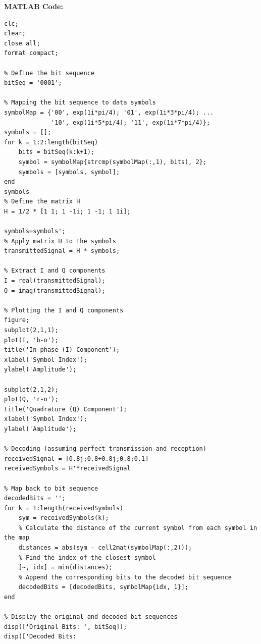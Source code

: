 \documentclass[12pt]{article}
\begin{document}
\newpage
\textbf{MATLAB Code:}
\begin{verbatim}
clc;
clear;
close all;
format compact;

% Define the bit sequence
bitSeq = '0001';

% Mapping the bit sequence to data symbols
symbolMap = {'00', exp(1i*pi/4); '01', exp(1i*3*pi/4); ...
             '10', exp(1i*5*pi/4); '11', exp(1i*7*pi/4)};
symbols = [];
for k = 1:2:length(bitSeq)
    bits = bitSeq(k:k+1);
    symbol = symbolMap{strcmp(symbolMap(:,1), bits), 2};
    symbols = [symbols, symbol];
end
symbols
% Define the matrix H
H = 1/2 * [1 1; 1 -1i; 1 -1; 1 1i];

symbols=symbols';
% Apply matrix H to the symbols
transmittedSignal = H * symbols;

% Extract I and Q components
I = real(transmittedSignal);
Q = imag(transmittedSignal);

% Plotting the I and Q components
figure;
subplot(2,1,1);
plot(I, 'b-o');
title('In-phase (I) Component');
xlabel('Symbol Index');
ylabel('Amplitude');

subplot(2,1,2);
plot(Q, 'r-o');
title('Quadrature (Q) Component');
xlabel('Symbol Index');
ylabel('Amplitude');

% Decoding (assuming perfect transmission and reception)
receivedSignal = [0.8j;0.8+0.8j;0.8;0.1]
receivedSymbols = H'*receivedSignal

% Map back to bit sequence
decodedBits = '';
for k = 1:length(receivedSymbols)
    sym = receivedSymbols(k);
    % Calculate the distance of the current symbol from each symbol in the map
    distances = abs(sym - cell2mat(symbolMap(:,2)));
    % Find the index of the closest symbol
    [~, idx] = min(distances);
    % Append the corresponding bits to the decoded bit sequence
    decodedBits = [decodedBits, symbolMap{idx, 1}];
end

% Display the original and decoded bit sequences
disp(['Original Bits: ', bitSeq]);
disp(['Decoded Bits:
\end{verbatim}
\end{document}
